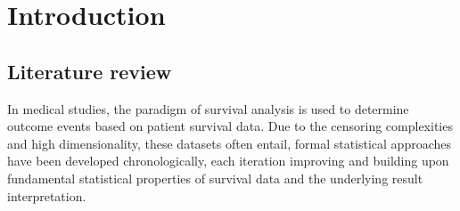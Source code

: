 \chapter{Introduction} %
\label{Chapter1} %


\noindent 
\section{Literature review}
\noindent In medical studies, the paradigm of survival analysis is used to determine outcome events based on patient survival data. Due to the censoring complexities and high dimensionality, these datasets often entail, formal statistical approaches have been developed chronologically, each iteration improving and building upon fundamental statistical properties of survival data and the underlying result interpretation. 
